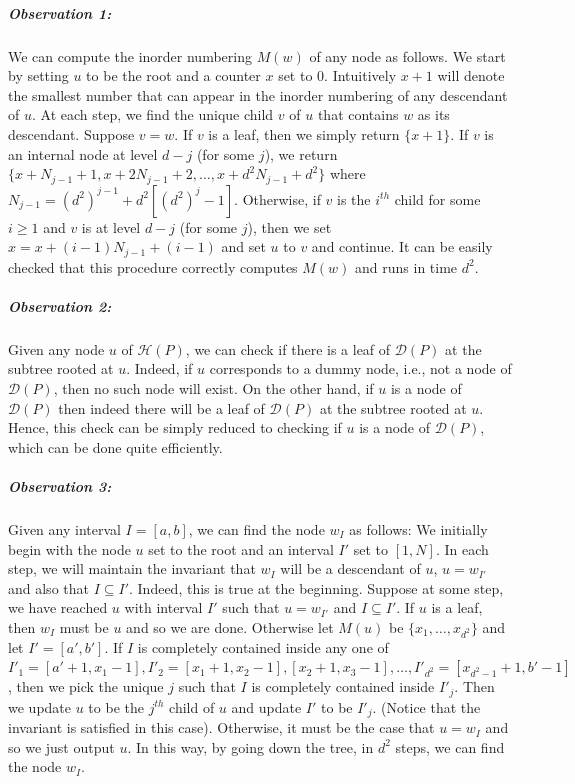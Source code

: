 \documentclass[acmsmall]{acmart}
\begin{document}
\subparagraph*{Observation 1: } We can compute the inorder numbering $M(w)$ of any node as follows. We start by setting $u$ to be the root and a counter $x$ set to 0. Intuitively $x+1$ will denote the smallest number that can appear in the inorder numbering of any descendant of $u$.
At each step, we find the unique child $v$ of $u$ that contains $w$ as its descendant.
Suppose $v = w$. If $v$ is a leaf, then we simply return $\{x+1\}$.
If $v$ is an internal node at level $d-j$ (for some $j$), we return $\{x + N_{j-1} + 1, x + 2 N_{j-1} + 2, \dots, x + d^2 N_{j-1} + d^2\}$ where $N_{j-1} = (d^2)^{j-1} + d^2 [(d^2)^j - 1]$. Otherwise, if $v$ is the $i^{th}$ child for some $i \ge 1$ and $v$ is at level $d-j$ (for some $j$), then we set $x = x + (i-1) N_{j-1} + (i-1)$ and set $u$ to $v$ and continue. It can be easily checked that this procedure correctly computes $M(w)$ and 
runs in time $d^2$.


\subparagraph*{Observation 2: } Given any node $u$ of $\mathcal{H}(P)$, we can check if 
there is a leaf of $\mathcal{D}(P)$ at the subtree rooted at $u$. Indeed, if $u$
corresponds to a dummy node, i.e., not a node of $\mathcal{D}(P)$, then
no such node will exist. On the other hand, if $u$ is a node of $\mathcal{D}(P)$
then indeed there will be a leaf of $\mathcal{D}(P)$ at the subtree rooted at $u$.
Hence, this check can be simply reduced to checking if $u$ is a node of $\mathcal{D}(P)$,
which can be done quite efficiently.

\subparagraph*{Observation 3: } Given any interval $I = [a,b]$, we can find the node 
$w_{I}$ as follows: We initially begin with the node $u$ set to the root and an interval $I'$ set to $[1,N]$. In each step, we will maintain the invariant that $w_I$ will be a descendant of $u$, $u = w_{I'}$ and also that $I \subseteq I'$. Indeed, this is true at the beginning.
Suppose at some step, we have reached $u$ with interval $I'$ such that $u = w_{I'}$
and $I \subseteq I'$. If $u$ is a leaf, then $w_I$ must be $u$ and so we are done.
Otherwise let $M(u)$ be $\{x_1,\dots,x_{d^2}\}$ and let $I' = [a',b']$. If $I$ is completely contained
inside any one of $I'_1 = [a'+1,x_1-1], I'_2 = [x_1+1,x_2-1], [x_2+1,x_3-1],\dots, I'_{d^2} = [x_{d^2-1}+1,b'-1]$, then we pick the unique $j$ such that $I$ is completely contained inside $I'_j$. Then we update $u$ to be the $j^{th}$ child of $u$ and update $I'$ to be $I'_j$. (Notice that the invariant is satisfied in this case). Otherwise,
it must be the case that $u = w_I$ and so we just output $u$. In this way, by going down the tree, in $d^2$ steps, we can find the node $w_I$.
\end{document}
